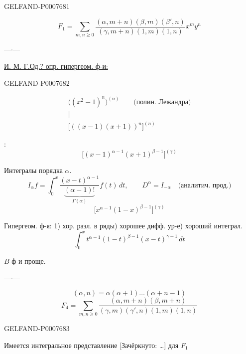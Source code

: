 \begin{GelfandAdjacentEvidence}{GELFAND-P000768}{1}

\begin{equation*}
\tag{1}
F_1=\sum_{m,n\geq 0}
\frac{(\alpha,m+n)(\beta,m)(\beta',n)}
{(\gamma,m+n)(1,m)(1,n)}x^m y^n
\end{equation*}

\begin{center}---\quad\(\cdot\)\quad---\end{center}

\underline{И. М. Г.}\quad\underline{Од.? опр. гипергеом. ф-и:}
\end{GelfandAdjacentEvidence}
\begin{GelfandAdjacentEvidence}{GELFAND-P000768}{2}

\[
\begin{gathered}
\bigl((x^2-1)^n\bigr)^{(n)}\qquad\text{(полин. Лежандра)}\\
\Vert\\
\bigl[((x-1)(x+1))^n\bigr]^{(n)}
\end{gathered}
\]

:
\[
\bigl[(x-1)^{\alpha-1}(x+1)^{\beta-1}\bigr]^{(\gamma)}
\]

Интегралы порядка \(\alpha\).
\[
I_\alpha f=\int_0^x\frac{(x-t)^{\alpha-1}}{\underbrace{(\alpha-1)!}_{\Gamma(\alpha)}}f(t)\,dt,
\qquad D^\alpha=I_{-\alpha}\quad\text{(аналитич. прод.)}
\]
\[
\bigl[x^{\alpha-1}(1-x)^{\beta-1}\bigr]^{(\gamma)}
\]

Гипергеом. ф-я: 1) хор. разл. в ряды) хорошее дифф. ур-е) хороший интеграл.
\[
\int_0^x t^{\alpha-1}(1-t)^{\beta-1}(x-t)^{\gamma-1}\,dt
\]

\(B\)-ф-и проще.

\begin{center}---\quad\(\cdot\)\quad---\end{center}

\[
(\alpha,n)=\alpha(\alpha+1)\ldots(\alpha+n-1)
\]
\begin{equation*}
\tag{2}
F_4=\sum_{m,n\geq 0}
\frac{(\alpha,m+n)(\beta,m+n)}
{(\gamma,m)(\gamma',n)(1,m)(1,n)}
\end{equation*}
\end{GelfandAdjacentEvidence}
\begin{GelfandAdjacentEvidence}{GELFAND-P000768}{3}


Имеется интегральное представление [Зачёркнуто: …] для \(F_1\)
\end{GelfandAdjacentEvidence}
